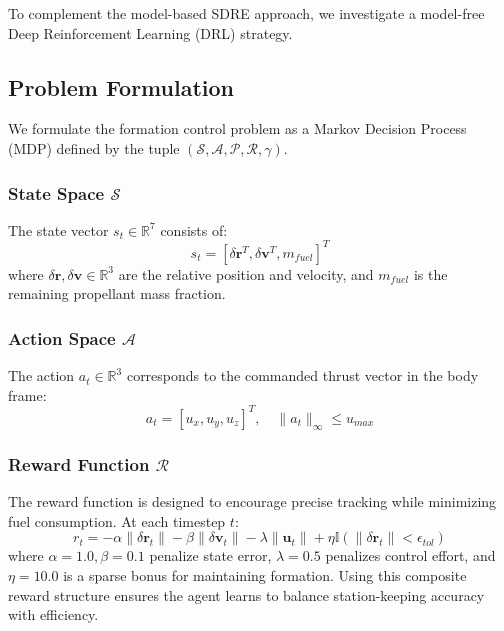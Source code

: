 \documentclass[10pt,letterpaper]{article}
\begin{document}
To complement the model-based SDRE approach, we investigate a model-free Deep Reinforcement Learning (DRL) strategy.

\subsection{Problem Formulation}
We formulate the formation control problem as a Markov Decision Process (MDP) defined by the tuple $(\mathcal{S}, \mathcal{A}, \mathcal{P}, \mathcal{R}, \gamma)$.

\subsubsection{State Space \texorpdfstring{$\mathcal{S}$}{S}}
The state vector $s_t \in \mathbb{R}^{7}$ consists of:
\begin{equation}
    s_t = [\delta \mathbf{r}^T, \delta \mathbf{v}^T, m_{fuel}]^T
\end{equation}
where $\delta \mathbf{r}, \delta \mathbf{v} \in \mathbb{R}^3$ are the relative position and velocity, and $m_{fuel}$ is the remaining propellant mass fraction.

\subsubsection{Action Space \texorpdfstring{$\mathcal{A}$}{A}}
The action $a_t \in \mathbb{R}^3$ corresponds to the commanded thrust vector in the body frame:
\begin{equation}
    a_t = [u_x, u_y, u_z]^T, \quad \|a_t\|_\infty \leq u_{max}
\end{equation}

\subsubsection{Reward Function \texorpdfstring{$\mathcal{R}$}{R}}
The reward function is designed to encourage precise tracking while minimizing fuel consumption. At each timestep $t$:
\begin{equation}
    r_t = -\alpha \|\delta \mathbf{r}_t\| - \beta \|\delta \mathbf{v}_t\| - \lambda \|\mathbf{u}_t\| + \eta \mathbb{I}(\|\delta \mathbf{r}_t\| < \epsilon_{tol})
\end{equation}
where $\alpha=1.0, \beta=0.1$ penalize state error, $\lambda=0.5$ penalizes control effort, and $\eta=10.0$ is a sparse bonus for maintaining formation. Using this composite reward structure ensures the agent learns to balance station-keeping accuracy with efficiency.
\end{document}
